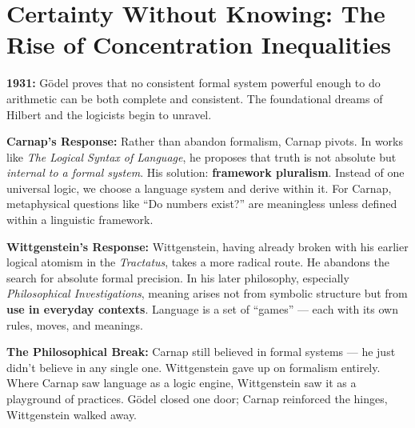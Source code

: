 \section{Certainty Without Knowing: The Rise of Concentration Inequalities}
\begin{tcolorbox}[title={\textbf{Historical Sidebar: After Gödel — Carnap and Wittgenstein at the Crossroads}}, colback=gray!5, colframe=black, fonttitle=\bfseries]

    \textbf{1931:} Gödel proves that no consistent formal system powerful enough to do arithmetic can be both complete and consistent. The foundational dreams of Hilbert and the logicists begin to unravel.
    
    \medskip
    
    \textbf{Carnap's Response:} Rather than abandon formalism, Carnap pivots. In works like \textit{The Logical Syntax of Language}, he proposes that truth is not absolute but \textit{internal to a formal system}. His solution: \textbf{framework pluralism}. Instead of one universal logic, we choose a language system and derive within it. For Carnap, metaphysical questions like “Do numbers exist?” are meaningless unless defined within a linguistic framework.
    
    \medskip
    
    \textbf{Wittgenstein's Response:} Wittgenstein, having already broken with his earlier logical atomism in the \textit{Tractatus}, takes a more radical route. He abandons the search for absolute formal precision. In his later philosophy, especially \textit{Philosophical Investigations}, meaning arises not from symbolic structure but from \textbf{use in everyday contexts}. Language is a set of “games” — each with its own rules, moves, and meanings.
    
    \medskip
    
    \textbf{The Philosophical Break:} Carnap still believed in formal systems — he just didn’t believe in any single one. Wittgenstein gave up on formalism entirely. Where Carnap saw language as a logic engine, Wittgenstein saw it as a playground of practices. Gödel closed one door; Carnap reinforced the hinges, Wittgenstein walked away.
    
\end{tcolorbox}
